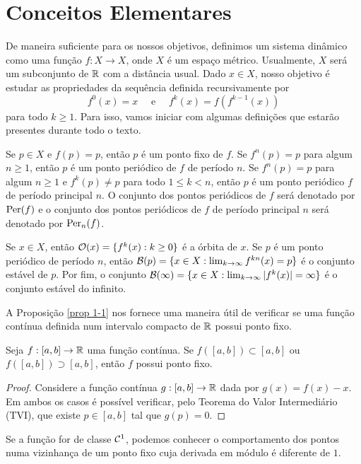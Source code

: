 \section{Conceitos Elementares}

De maneira suficiente para os nossos objetivos, definimos um sistema dinâmico como uma função $f: X \to X$, onde $X$ é um espaço métrico.
Usualmente, $X$ será um subconjunto de $\mathbb{R}$ com a distância usual.
Dado $x \in X$, nosso objetivo é estudar as propriedades da sequência definida recursivamente por
$$f^0(x) = x \quad \text{ e } \quad f^k(x) = f(f^{k-1}(x))$$
para todo $k \geq 1$. Para isso, vamos iniciar com algumas definições que estarão presentes durante todo o texto.

Se $p \in X$ e $f(p) = p$, então $p$ é um ponto fixo de $f$.
Se $f^n(p) = p$ para algum $n \geq 1$, então $p$ é um ponto periódico de $f$ de período $n$.
Se $f^n(p) = p$ para algum $n \geq 1$ e $f^k(p) \neq p$ para todo $1 \leq k < n$, então $p$ é um ponto periódico $f$ de período principal $n$.
O conjunto dos pontos periódicos de $f$ será denotado por $\operatorname{Per}(f)$ e o conjunto dos pontos periódicos de $f$ de período principal $n$ será denotado por $\operatorname{Per}_n(f)$.

Se $x \in X$, então $\mathcal{O}(x) = \lbrace f^k(x) : k \geq 0 \rbrace$ é a órbita de $x$.
Se $p$ é um ponto periódico de período $n$, então $\mathcal{B}(p) = \lbrace x \in  X: \lim_{k \to \infty} f^{kn}(x) = p \rbrace$ é o conjunto estável de $p$.
Por fim, o conjunto $\mathcal{B}(\infty) = \lbrace x \in  X: \lim_{k \to \infty} |f^k(x)| = \infty \rbrace$ é o conjunto estável do infinito.

A Proposição \ref{prop 1-1} nos fornece uma maneira útil de verificar se uma função contínua definida num intervalo compacto de $\mathbb{R}$ possui ponto fixo.

\begin{proposition}\label{prop 1-1}
Seja $f: [a, b] \to \mathbb{R}$ uma função contínua. Se $f([a, b]) \subset [a, b]$ ou $f([a, b]) \supset [a, b]$, então $f$ possui ponto fixo.
\end{proposition}

\begin{proof}
Considere a função contínua $g: [a, b] \to \mathbb{R}$ dada por $g(x) = f(x) - x$. Em ambos os casos é possível verificar, pelo Teorema do Valor Intermediário (TVI), que existe $p \in [a, b]$ tal que $g(p) = 0$.
\end{proof}

Se a função for de classe $\mathcal{C}^1$, podemos conhecer o comportamento dos pontos numa vizinhança de um ponto fixo cuja derivada em módulo é diferente de $1$.

